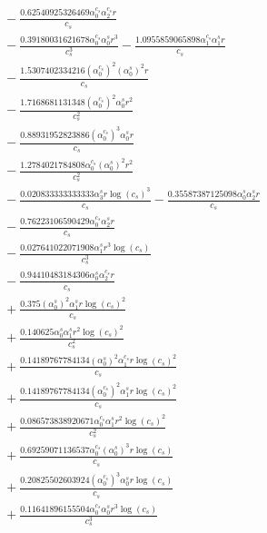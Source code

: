 \documentclass[10pt]{article}
\begin{document}
\begin{align*}
&{}  - \frac{0.62540925326469 \alpha_{0}^{c_s} \alpha_{2}^{c_s} r}{c_{s}} \\
&{}  - \frac{0.39180031621678 \alpha_{0}^{c_s} \alpha_{0}^s r^{3}}{c_{s}^{3}} - \frac{1.0955859065898 \alpha_{1}^{c_s} \alpha_{1}^s r}{c_{s}} \\
&{}  - \frac{1.5307402334216 \left(\alpha_{0}^{c_s}\right)^{2} \left(\alpha_{0}^s\right)^{2} r}{c_{s}} \\
&{}  - \frac{1.7168681131348 \left(\alpha_{0}^{c_s}\right)^{2} \alpha_{0}^s r^{2}}{c_{s}^{2}} \\
&{}  - \frac{0.88931952823886 \left(\alpha_{0}^{c_s}\right)^{3} \alpha_{0}^s r}{c_{s}} \\
&{}  - \frac{1.2784021784808 \alpha_{0}^{c_s} \left(\alpha_{0}^s\right)^{2} r^{2}}{c_{s}^{2}} \\
&{}  - \frac{0.020833333333333 \alpha_{3}^s r \log{\left(c_{s} \right)}^{3}}{c_{s}} - \frac{0.35587387125098 \alpha_{0}^s \alpha_{2}^s r}{c_{s}} \\
&{}  - \frac{0.76223106590429 \alpha_{0}^{c_s} \alpha_{2}^s r}{c_{s}} \\
&{}  - \frac{0.027641022071908 \alpha_{1}^s r^{3} \log{\left(c_{s} \right)}}{c_{s}^{3}} \\
&{}  - \frac{0.94410483184306 \alpha_{0}^s \alpha_{2}^{c_s} r}{c_{s}} \\
&{}  + \frac{0.375 \left(\alpha_{0}^s\right)^{2} \alpha_{1}^s r \log{\left(c_{s} \right)}^{2}}{c_{s}} \\
&{}  + \frac{0.140625 \alpha_{0}^s \alpha_{1}^s r^{2} \log{\left(c_{s} \right)}^{2}}{c_{s}^{2}} \\
&{}  + \frac{0.14189767784134 \left(\alpha_{0}^s\right)^{2} \alpha_{1}^{c_s} r \log{\left(c_{s} \right)}^{2}}{c_{s}} \\
&{}  + \frac{0.14189767784134 \left(\alpha_{0}^{c_s}\right)^{2} \alpha_{1}^s r \log{\left(c_{s} \right)}^{2}}{c_{s}} \\
&{}  + \frac{0.086573838920671 \alpha_{0}^{c_s} \alpha_{1}^s r^{2} \log{\left(c_{s} \right)}^{2}}{c_{s}^{2}} \\
&{}  + \frac{0.69259071136537 \alpha_{0}^{c_s} \left(\alpha_{0}^s\right)^{3} r \log{\left(c_{s} \right)}}{c_{s}} \\
&{}  + \frac{0.20825502603924 \left(\alpha_{0}^{c_s}\right)^{3} \alpha_{0}^s r \log{\left(c_{s} \right)}}{c_{s}} \\
&{}  + \frac{0.11641896155504 \alpha_{0}^{c_s} \alpha_{0}^s r^{3} \log{\left(c_{s} \right)}}{c_{s}^{3}} \\

\end{align*}
\end{document}
